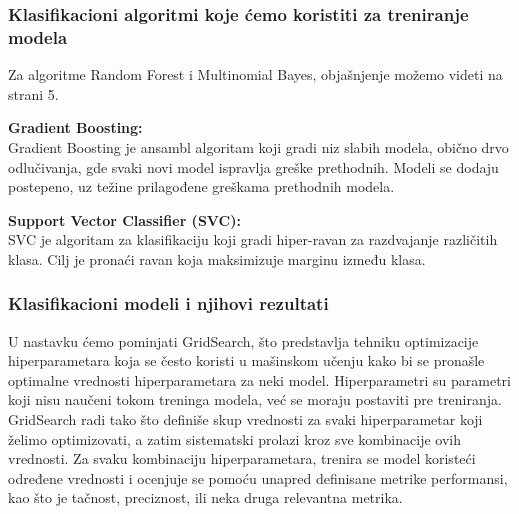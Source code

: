 \documentclass{article}
\begin{document}


\subsubsection{Klasifikacioni algoritmi koje ćemo koristiti za treniranje modela}
\begin{flushleft}

Za algoritme Random Forest i Multinomial Bayes, objašnjenje možemo videti na strani 5.
\vspace{2.75mm}


\textbf{Gradient Boosting:}\\
Gradient Boosting je ansambl algoritam koji gradi niz slabih modela, obično drvo odlučivanja, gde svaki novi model ispravlja greške prethodnih. Modeli se dodaju postepeno, uz težine prilagođene greškama prethodnih modela.
\vspace{2.75mm}

\textbf{Support Vector Classifier (SVC):}\\
SVC je algoritam za klasifikaciju koji gradi hiper-ravan za razdvajanje različitih klasa. Cilj je pronaći ravan koja maksimizuje marginu između klasa.



\end{flushleft}


\newpage
\subsubsection{Klasifikacioni modeli i njihovi rezultati}
\begin{flushleft}
\vspace{1mm}

U nastavku ćemo pominjati GridSearch, što predstavlja tehniku optimizacije hiperparametara koja se često koristi u mašinskom učenju kako bi se pronašle optimalne vrednosti hiperparametara za neki model. Hiperparametri su parametri koji nisu naučeni tokom treninga modela, već se moraju postaviti pre treniranja. 
GridSearch radi tako što definiše skup vrednosti za svaki hiperparametar koji želimo optimizovati, a zatim sistematski prolazi kroz sve kombinacije ovih vrednosti. Za svaku kombinaciju hiperparametara, trenira se model koristeći određene vrednosti i ocenjuje se pomoću unapred definisane metrike performansi, kao što je tačnost, preciznost, ili neka druga relevantna metrika.

\end{flushleft}

\vspace{2.5mm}
\end{document}
